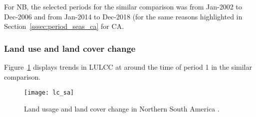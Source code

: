 For \ac{NB}, the selected periods for the similar comparison was from Jan-2002 to Dec-2006 and from Jan-2014 to Dec-2018 (for the same reasons highlighted in Section~\ref{sssec:period_seas_ca} for \ac{CA}.

\subsubsection{Land use and land cover change}

Figure~\ref{fig:lc_sa} displays trends in \ac{LULCC} at around the time of period 1 in the similar comparison.

\begin{figure}[!ht]
	\centering
	\texttt{[image: lc\_sa]}
	\caption[Northern Brazil Land Usage]{Land usage and land cover change in Northern South America \citep{ipcc_2007}.}
	\label{fig:lc_sa}
\end{figure}